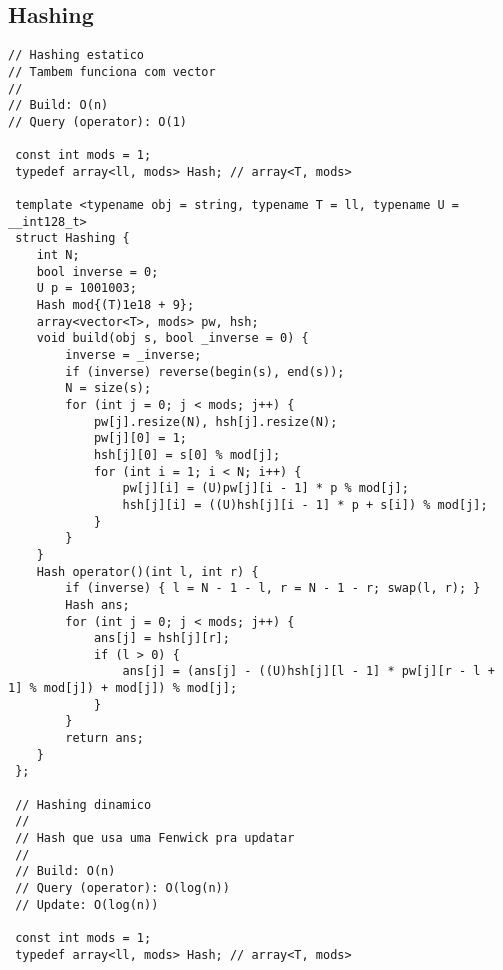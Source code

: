 \documentclass[11pt, a4paper, twoside]{article}
\begin{document}
\subsection{Hashing}
\begin{lstlisting}
// Hashing estatico
// Tambem funciona com vector
//
// Build: O(n)
// Query (operator): O(1)

 const int mods = 1;
 typedef array<ll, mods> Hash; // array<T, mods>
 
 template <typename obj = string, typename T = ll, typename U = __int128_t>
 struct Hashing {
 	int N;
 	bool inverse = 0;
 	U p = 1001003;
 	Hash mod{(T)1e18 + 9};
 	array<vector<T>, mods> pw, hsh;
 	void build(obj s, bool _inverse = 0) {
 		inverse = _inverse;
 		if (inverse) reverse(begin(s), end(s));
 		N = size(s);
 		for (int j = 0; j < mods; j++) {
 			pw[j].resize(N), hsh[j].resize(N);
 			pw[j][0] = 1;
 			hsh[j][0] = s[0] % mod[j];
 			for (int i = 1; i < N; i++) {
 				pw[j][i] = (U)pw[j][i - 1] * p % mod[j];
 				hsh[j][i] = ((U)hsh[j][i - 1] * p + s[i]) % mod[j];
 			}
 		}
 	}
 	Hash operator()(int l, int r) {
 		if (inverse) { l = N - 1 - l, r = N - 1 - r; swap(l, r); }
 		Hash ans;
 		for (int j = 0; j < mods; j++) {
 			ans[j] = hsh[j][r];
 			if (l > 0) {
 				ans[j] = (ans[j] - ((U)hsh[j][l - 1] * pw[j][r - l + 1] % mod[j]) + mod[j]) % mod[j];
 			}
 		}
 		return ans;
 	}
 };
 
 // Hashing dinamico
 //
 // Hash que usa uma Fenwick pra updatar
 //
 // Build: O(n)
 // Query (operator): O(log(n))
 // Update: O(log(n))
 
 const int mods = 1;
 typedef array<ll, mods> Hash; // array<T, mods>
 

\end{lstlisting}
\end{document}
